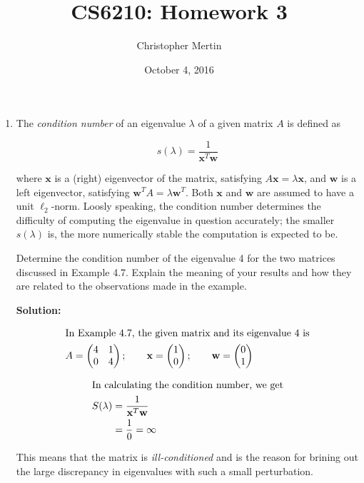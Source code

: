 \documentclass[12pt]{article}
\begin{document}
\title{CS6210: Homework 3}
\author{Christopher Mertin}
\date{October 4, 2016}
\maketitle

\begin{enumerate}
\item The {\em condition number} of an eigenvalue $\lambda$ of a given matrix $A$ is defined as

\[
s(\lambda) = \frac{1}{\mathbf{x}^{T}\mathbf{w}}
\]

where $\mathbf{x}$ is a (right) eigenvector of the matrix, satisfying $A\mathbf{x} = \lambda \mathbf{x}$,
and $\mathbf{w}$ is a left eigenvector, satisfying $\mathbf{w}^{T}A = \lambda \mathbf{w}^{T}$.
Both $\mathbf{x}$ and $\mathbf{w}$ are assumed to have a unit $\ell_{2}$-norm. Loosly speaking,
the condition number determines the difficulty of computing the eigenvalue in question accurately;
the smaller $s(\lambda)$ is, the more numerically stable the computation is expected to be.

Determine the condition number of the eigenvalue 4 for the two matrices discussed in Example 4.7.
Explain the meaning of your results and how they are related to the observations made in the example.

{\bf Solution:}

\begin{align*}
\intertext{In Example 4.7, the given matrix and its eigenvalue 4 is}
A &= \begin{pmatrix}
    4 & 1\\
    0 & 4
\end{pmatrix};\quad\quad \mathbf{x} = \begin{pmatrix}1\\ 0\end{pmatrix};\quad\quad \mathbf{w}=\begin{pmatrix}0\\ 1\end{pmatrix}
\end{align*}

\begin{align*}
\intertext{In calculating the condition number, we get}
S(\lambda) &= \frac{1}{\mathbf{x}^{T}\mathbf{w}}\\
           &= \frac{1}{0} = \infty
\end{align*}

This means that the matrix is {\em ill-conditioned} and is the reason for brining out the
large discrepancy in eigenvalues with such a small perturbation.


\end{enumerate}
\end{document}
